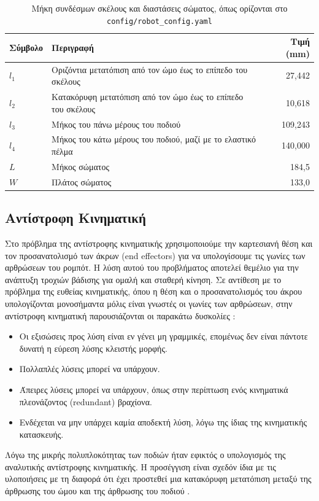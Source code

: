 \documentclass[11pt]{report}
\begin{document}
\begin{table}[htbp]
    \centering
    \small
    \begin{tabular}{@{}l p{7.0cm} r@{}}
        \toprule
        Σύμβολο & Περιγραφή & Τιμή (mm) \\
        \midrule
        $l_1$ & Οριζόντια μετατόπιση από τον ώμο έως το επίπεδο του σκέλους & 27,442 \\
        $l_2$ & Κατακόρυφη μετατόπιση από τον ώμο έως το επίπεδο του σκέλους & 10,618 \\
        $l_3$ & Μήκος του πάνω μέρους του ποδιού & 109,243 \\
        $l_4$ & Μήκος του κάτω μέρους του ποδιού, μαζί με το ελαστικό πέλμα & 140,000 \\
        \midrule
        $L$ & Μήκος σώματος & 184,5 \\
        $W$ & Πλάτος σώματος & 133,0 \\
        \bottomrule
    \end{tabular}
    \caption[Μήκη συνδέσμων σκέλους και διαστάσεις σώματος]{Μήκη συνδέσμων σκέλους και διαστάσεις σώματος, όπως ορίζονται στο
    \texttt{config/robot\_config.yaml}}
    \label{tab:leg-link-params}
\end{table}

\subsection{Αντίστροφη Κινηματική}
\label{subsec:inverse-kinematics}
Στο πρόβλημα της αντίστροφης κινηματικής χρησιμοποιούμε την καρτεσιανή θέση και
τον προσανατολισμό των άκρων (end effectors) για να υπολογίσουμε
τις γωνίες των αρθρώσεων του ρομπότ. Η λύση αυτού του προβλήματος αποτελεί θεμέλιο για την ανάπτυξη τροχιών
βάδισης για ομαλή και σταθερή κίνηση. Σε αντίθεση με το πρόβλημα της ευθείας
κινηματικής, όπου η θέση και ο προσανατολισμός του άκρου υπολογίζονται μονοσήμαντα
μόλις είναι γνωστές οι γωνίες των αρθρώσεων, στην αντίστροφη κινηματική
παρουσιάζονται οι
παρακάτω δυσκολίες \cite{siciliano_robotics_2009}:
\begin{itemize}
    \item  Οι εξισώσεις προς λύση είναι εν γένει μη γραμμικές, επομένως δεν
    είναι πάντοτε δυνατή η εύρεση λύσης κλειστής μορφής.
    \item  Πολλαπλές λύσεις μπορεί να υπάρχουν.
    \item  Άπειρες λύσεις μπορεί να υπάρχουν, όπως στην περίπτωση ενός
    κινηματικά πλεονάζοντος (\foreignlanguage{english}{redundant}) βραχίονα.
    \item  Ενδέχεται να μην υπάρχει καμία αποδεκτή λύση, λόγω της ίδιας της
    κινηματικής κατασκευής.
\end{itemize}
Λόγω της μικρής πολυπλοκότητας των ποδιών ήταν εφικτός ο υπολογισμός της αναλυτικής
αντίστροφης κινηματικής. Η προσέγγιση είναι σχεδόν ίδια με τις υλοποιήσεις
\cite{sen_inverse_2017,rahman_kinematics_2022} με τη διαφορά ότι έχει προστεθεί μια κατακόρυφη μετατόπιση
μεταξύ της άρθρωσης του ώμου και της άρθρωσης του ποδιού \cite{spotmicroai_project}.
\end{document}
